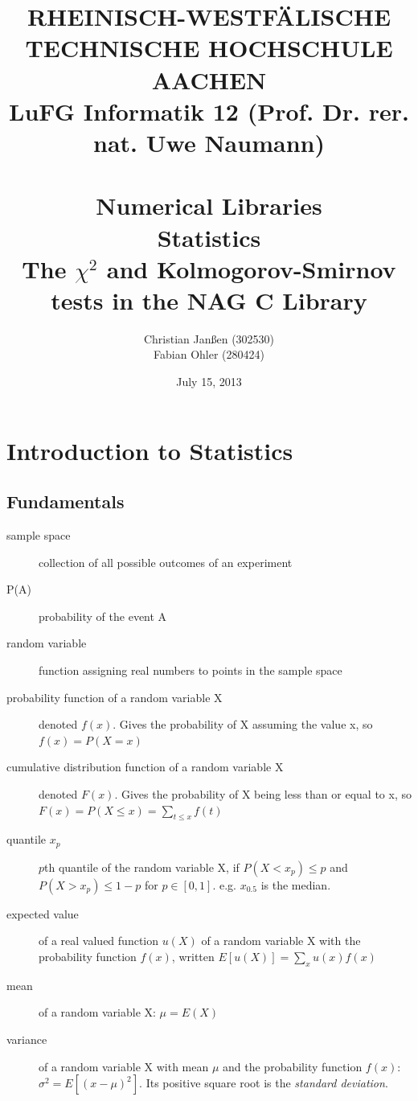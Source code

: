 \documentclass{article}
\title{
{\bf \scriptsize RHEINISCH-WESTF\"ALISCHE TECHNISCHE HOCHSCHULE AACHEN \\
LuFG Informatik 12 (Prof. Dr. rer. nat. Uwe Naumann)}
\vspace{.5cm} \\
\epsfig{file=figures/STCE_Logo_WWW.eps,width=.7\textwidth}
\vspace{1cm} \\
{\bf \Large Numerical Libraries} \\
{\bf \large Statistics} \\
{\large The $\chi^2$ and Kolmogorov-Smirnov tests in the NAG C Library}
}
\author{Christian Janßen (302530) \\ Fabian Ohler (280424) }
\date{July 15, 2013}
\begin{document}

\begin{titlepage}
\clearpage
\maketitle
\thispagestyle{empty}
\end{titlepage}

\tableofcontents

\pagestyle{headings}
\newpage



\section{Introduction to Statistics}
\subsection{Fundamentals}
\begin{description}
	\item[sample space] collection of all possible outcomes of an experiment
	\item[P(A)] probability of the event A
	\item[random variable] function assigning real numbers to points in the sample space
	\item[probability function of a random variable X] denoted $f(x)$. Gives the probability of X assuming the value x, so $f(x) = P(X = x)$
	\item[cumulative distribution function of a random variable X] denoted $F(x)$. Gives the probability of X being less than or equal to x, so $F(x) = P(X \leq x) = \sum_{t\leq x}f(t)$
	\item[quantile $x_p$] $p$th quantile of the random variable X, if $P(X<x_p)\leq p$ and $P(X>x_p)\leq 1-p$ for $p\in[0,1]$. e.g. $x_{0.5}$ is the median.
	\item[expected value] of a real valued function $u(X)$ of a random variable X with the probability function $f(x)$, written $E[u(X)] = \sum_{x}u(x)f(x)$
	\item[mean] of a random variable X: $\mu = E(X)$
	\item[variance] of a random variable X with mean $\mu$ and the probability function $f(x)$: $\sigma^2 = E[(x-\mu)^2]$. Its positive square root is the \emph{standard deviation}.

\end{description}
\end{document}
